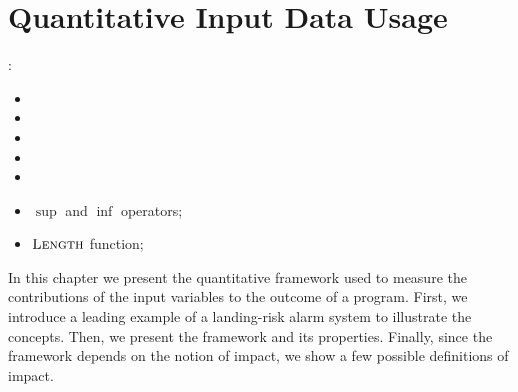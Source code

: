 %

\chapter{Quantitative Input Data Usage}

:
\begin{itemize}
  \item {}
  \item {}
  \item {}
  \item {}
  \item {}
\end{itemize}

\begin{itemize}
  \item $\sup$ and $\inf$ operators;
  \item $\textup{\textsc{Length}}$ function;
\end{itemize}

In this chapter we present the quantitative framework used to measure the contributions of the input variables to the outcome of a program. First, we introduce a leading example of a landing-risk alarm system to illustrate the concepts. Then, we present the framework and its properties. Finally, since the framework depends on the notion of impact, we show a few possible definitions of impact.




% 


